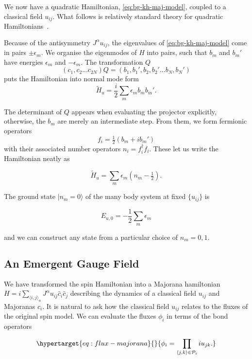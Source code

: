 We now have a quadratic Hamiltonian, \cref{eq:bg-kh-maj-model}, coupled to a classical field \(u_{ij}\). What follows is relatively standard theory for quadratic Hamiltonians~\autocite{BlaizotRipka1986}.

Because of the antisymmetry \(J^{\alpha} u_{ij}\), the eigenvalues of \cref{eq:bg-kh-maj-model} come in pairs \(\pm \epsilon_m\). We organise the eigenmodes of \(H\) into pairs, such that \(b_m\) and \(b_m'\) have energies \(\epsilon_m\) and \(-\epsilon_m\). The transformation \(Q\) \[(c_1, c_2... c_{2N}) Q = (b_1, b_1', b_2, b_2' ... b_{N}, b_{N}')\] puts the Hamiltonian into normal mode form \[\tilde{H}_u = \frac{i}{2} \sum_m \epsilon_m b_m b_m'.\]

The determinant of \(Q\) appears when evaluating the projector explicitly, otherwise, the \(b_m\) are merely an intermediate step. From them, we form fermionic operators \[ f_i = \tfrac{1}{2} (b_m + ib_m')\] with their associated number operators \(n_i = f^\dagger_i f_i\). These let us write the Hamiltonian neatly as

\[ \tilde{H}_u = \sum_m \epsilon_m (n_m - \tfrac{1}{2}).\]

The ground state \(|n_m = 0\rangle\) of the many body system at fixed \(\{u_{ij}\}\) is

\[E_{u,0} = -\frac{1}{2}\sum_m \epsilon_m \]

and we can construct any state from a particular choice of \(n_m = 0,1\).

\hypertarget{an-emergent-gauge-field}{%
\subsection{An Emergent Gauge Field}\label{an-emergent-gauge-field}}

We have transformed the spin Hamiltonian into a Majorana hamiltonian \(H = i \sum_{\langle i,j\rangle_\alpha} J^{\alpha} u_{ij} \hat{c}_i \hat{c}_j\) describing the dynamics of a classical field \(u_{ij}\) and Majoranas \(c_i\). It is natural to ask how the classical field \(u_{ij}\) relates to the fluxes of the original spin model. We can evaluate the fluxes \(\phi_i\) in terms of the bond operators

\begin{equation}\protect\hypertarget{eq:flux-majorana}{}{\phi_i = \prod_{\langle j,k\rangle \in \mathcal{P}_i} i u_{jk}.}\label{eq:flux-majorana}\end{equation}

